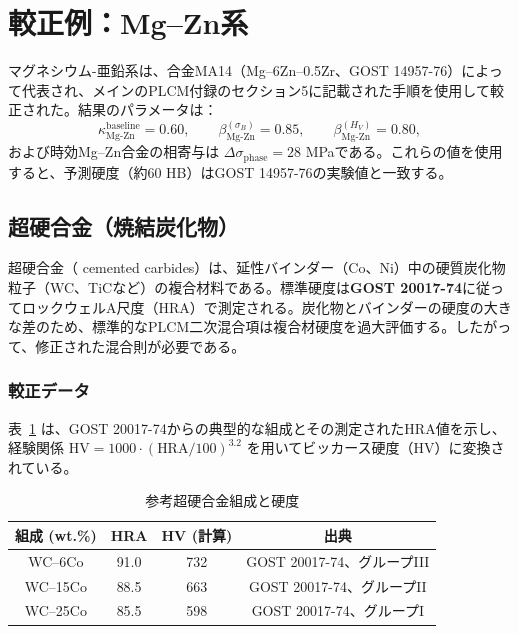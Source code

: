 \documentclass[12pt,a4paper]{article}
\begin{document}
	\section{較正例：Mg–Zn系}
	マグネシウム-亜鉛系は、合金MA14（Mg–6Zn–0.5Zr、GOST 14957-76）によって代表され、メインのPLCM付録のセクション5に記載された手順を使用して較正された。結果のパラメータは：
	\[
	\kappa_{\text{Mg-Zn}}^{\text{baseline}} = 0.60,\qquad
	\beta_{\text{Mg-Zn}}^{(\sigma_B)} = 0.85,\qquad
	\beta_{\text{Mg-Zn}}^{(H_V)} = 0.80,
	\]
	および時効Mg–Zn合金の相寄与は $\Delta\sigma_{\text{phase}} = 28$ MPaである。これらの値を使用すると、予測硬度（約60 HB）はGOST 14957-76の実験値と一致する。
	
	
	\subsection{超硬合金（焼結炭化物）}
	\label{subsec:hardmetals}
	
	超硬合金（ cemented carbides）は、延性バインダー（Co、Ni）中の硬質炭化物粒子（WC、TiCなど）の複合材料である。標準硬度は\textbf{GOST 20017-74}に従ってロックウェルA尺度（HRA）で測定される。炭化物とバインダーの硬度の大きな差のため、標準的なPLCM二次混合項は複合材硬度を過大評価する。したがって、修正された混合則が必要である。
	
	\subsubsection{較正データ}
	表~\ref{tab:hardmetal_compositions} は、GOST 20017-74からの典型的な組成とその測定されたHRA値を示し、経験関係 $\text{HV} = 1000 \cdot (\text{HRA}/100)^{3.2}$ を用いてビッカース硬度（HV）に変換されている。
	
	\begin{table}[htbp]
		\centering
		\caption{参考超硬合金組成と硬度}
		\label{tab:hardmetal_compositions}
		\begin{tabular}{cccc}
			\toprule
			\textbf{組成 (wt.\%)} & \textbf{HRA} & \textbf{HV (計算)} & \textbf{出典} \\
			\midrule
			WC–6Co & 91.0 & 732 & GOST 20017-74、グループIII \\
			WC–15Co & 88.5 & 663 & GOST 20017-74、グループII \\
			WC–25Co & 85.5 & 598 & GOST 20017-74、グループI \\
			\bottomrule
		\end{tabular}
	\end{table}
	
\end{document}
